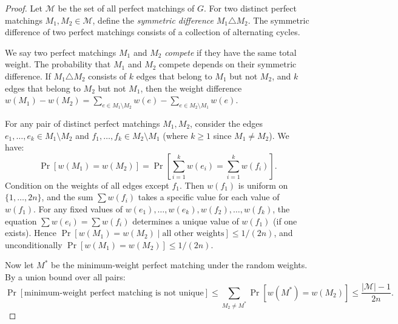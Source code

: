 \documentclass[twoside,12pt]{book}
\theoremstyle{plain}
\theoremstyle{definition}
\theoremstyle{remark}
\begin{document}
\begin{proof}
\iffalse
Let $\mathcal{M}$ be the set of all perfect matchings of $G$. For two distinct perfect matchings $M_1, M_2 \in \mathcal{M}$, define the \emph{symmetric difference} $M_1 \triangle M_2$. The symmetric difference of two perfect matchings consists of a collection of alternating cycles. 

We say two perfect matchings $M_1$ and $M_2$ \emph{compete} if they have the same total weight. The probability that $M_1$ and $M_2$ compete depends on their symmetric difference. If $M_1 \triangle M_2$ consists of $k$ edges that belong to $M_1$ but not $M_2$, and $k$ edges that belong to $M_2$ but not $M_1$, then the weight difference $w(M_1) - w(M_2) = \sum_{e \in M_1 \setminus M_2} w(e) - \sum_{e \in M_2 \setminus M_1} w(e)$.

For any pair of distinct perfect matchings $M_1, M_2$, consider the edges $e_1, \ldots, e_k \in M_1 \setminus M_2$ and $f_1, \ldots, f_k \in M_2 \setminus M_1$ (where $k \geq 1$ since $M_1 \neq M_2$). We have:
\[
\Pr[w(M_1) = w(M_2)] = \Pr\left[\sum_{i=1}^{k} w(e_i) = \sum_{i=1}^{k} w(f_i)\right].
\]
Condition on the weights of all edges except $f_1$. Then $w(f_1)$ is uniform on $\{1, \ldots, 2n\}$, and the sum $\sum w(f_i)$ takes a specific value for each value of $w(f_1)$. For any fixed values of $w(e_1), \ldots, w(e_k), w(f_2), \ldots, w(f_k)$, the equation $\sum w(e_i) = \sum w(f_i)$ determines a unique value of $w(f_1)$ (if one exists). Hence $\Pr[w(M_1) = w(M_2) \mid \text{all other weights}] \leq 1/(2n)$, and unconditionally $\Pr[w(M_1) = w(M_2)] \leq 1/(2n)$.

Now let $M^*$ be the minimum-weight perfect matching under the random
weights. By a union bound over all pairs:
\[
\Pr[\text{minimum-weight perfect matching is not unique}] \leq \sum_{M_2 \neq M^*} \Pr[w(M^*) = w(M_2)] \leq \frac{|\mathcal{M}| - 1}{2n}.
\]


\end{proof}
\end{document}
